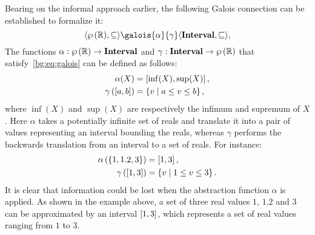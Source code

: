 Bearing on the informal approach earlier, the following Galois connection can
be established to formalize it:
\begin{equation}
    \lattice{\powersetof\realset}{\subseteq}
    \galois{\alpha}{\gamma}
    \lattice{\intervalset}{\sqsubseteq},
\end{equation}
The functions $\alpha: \wp\left({\mathbb{R}}\right) \to \mathbf{Interval}$ and $\gamma:
\mathbf{Interval} \to \wp\left({\mathbb{R}}\right)$ that satisfy~\eqref{bg:eq:galois} can be
defined as follows:
\begin{equation}
    \begin{aligned}
        \alpha(X) &= \left[{\inf(X)}, {\sup(X)}\right], \\
        \gamma\left( \left[{a}, {b}\right] \right) &= \left\{
            v \mid a \leq v \leq b
        \right\},
    \end{aligned}
\end{equation}
where $\inf(X)$ and $\sup(X)$ are respectively the infimum and supremum of $X$.
Here $\alpha$ takes a potentially infinite set of reals and translate it into
a pair of values representing an interval bounding the reals, whereas $\gamma$
performs the backwards translation from an interval to a set of reals.  For
instance:
\begin{equation}
    \begin{aligned}
        \alpha\left(\left\{1, 1.2, 3\right\}\right) &= \left[{1}, {3}\right], \\
        \gamma\left(\left[{1}, {3}\right]\right) &= \left\{
            v \mid 1 \leq v \leq 3
        \right\}.
    \end{aligned}
\end{equation}
It is clear that information could be lost when the abstraction function
$\alpha$ is applied.  As shown in the example above, a set of three real values
$1$, $1.2$ and $3$ can be approximated by an interval $\left[{1}, {3}\right]$, which
represents a set of real values ranging from $1$ to $3$.


